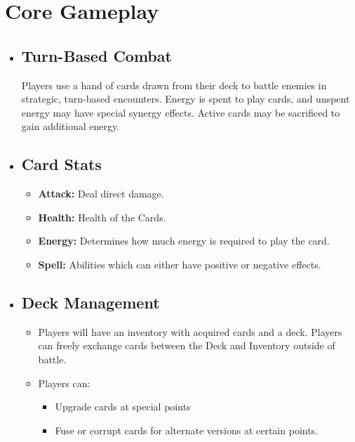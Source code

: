 \documentclass[10pt, a4paper]{article}
\begin{document}
	\section{Core Gameplay}
	\begin{itemize}
		\item \subsection{Turn-Based Combat} Players use a hand of cards drawn from their deck to battle enemies in strategic, turn-based encounters. Energy is spent to play cards, and unspent energy may have special synergy effects. Active cards may be sacrificed to gain additional energy.
		
		\item \subsection{Card Stats}
		\begin{itemize}
			\item \textbf{Attack:} Deal direct damage.
			\item \textbf{Health:} Health of the Cards.
			\item \textbf{Energy:} Determines how much energy is required to play the card.
			\item \textbf{Spell:} Abilities which can either have positive or negative effects.
		\end{itemize}
		
		\item \subsection{Deck Management} 
		\begin{itemize}
		\item Players will have an inventory with acquired cards and a deck. Players can freely exchange cards between the Deck and Inventory outside of battle.
		\item Players can:
		\begin{itemize}
			\item Upgrade cards at special points
			\item Fuse or corrupt cards for alternate versions at certain points.
		\end{itemize}
	    \end{itemize}
	    

\end{itemize}
\end{document}
